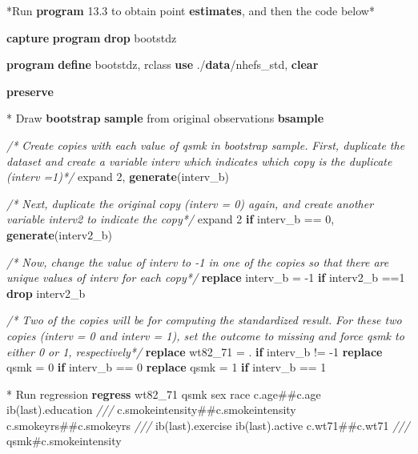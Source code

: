 \documentclass[
  10pt,
]{book}
\newenvironment{Shaded}{\begin{snugshade}}{\end{snugshade}}
\newcommand{\CommentTok}[1]{\textcolor[rgb]{0.56,0.35,0.01}{\textit{#1}}}
\newcommand{\FunctionTok}[1]{\textcolor[rgb]{0.00,0.00,0.00}{#1}}
\newcommand{\KeywordTok}[1]{\textcolor[rgb]{0.13,0.29,0.53}{\textbf{#1}}}
\newcommand{\NormalTok}[1]{#1}
\begin{document}
\begin{Shaded}
\begin{Highlighting}[]
\NormalTok{*Run }\KeywordTok{program}\NormalTok{ 13.3 to obtain point }\KeywordTok{estimates}\NormalTok{, and then the code below*}

\KeywordTok{capture} \KeywordTok{program} \KeywordTok{drop}\NormalTok{ bootstdz}

\KeywordTok{program} \KeywordTok{define}\NormalTok{ bootstdz, rclass}
\KeywordTok{use}\NormalTok{ ./}\KeywordTok{data}\NormalTok{/nhefs\_std, }\KeywordTok{clear}

\KeywordTok{preserve}

\NormalTok{* Draw }\KeywordTok{bootstrap} \KeywordTok{sample}\NormalTok{ from original observations}
\KeywordTok{bsample} 
        
\CommentTok{/* Create copies with each value of qsmk in bootstrap sample.}
\CommentTok{First, duplicate the dataset and create a variable \textasciigrave{}interv\textasciigrave{} which}
\CommentTok{indicates which copy is the duplicate (interv =1)*/}
\NormalTok{expand 2, }\KeywordTok{generate}\NormalTok{(interv\_b)}

\CommentTok{/* Next, duplicate the original copy (interv = 0) again, and create}
\CommentTok{another variable \textasciigrave{}interv2\textasciigrave{} to indicate the copy*/}
\NormalTok{expand 2 }\KeywordTok{if}\NormalTok{ interv\_b == 0, }\KeywordTok{generate}\NormalTok{(interv2\_b)}

\CommentTok{/* Now, change the value of interv to {-}1 in one of the copies so that}
\CommentTok{there are unique values of interv for each copy*/}
\KeywordTok{replace}\NormalTok{ interv\_b = {-}1  }\KeywordTok{if}\NormalTok{ interv2\_b ==1}
\KeywordTok{drop}\NormalTok{ interv2\_b}

\CommentTok{/* Two of the copies will be for computing the standardized result.}
\CommentTok{For these two copies (interv = 0 and interv = 1), set the outcome to}
\CommentTok{missing and force qsmk to either 0 or 1, respectively*/}
\KeywordTok{replace}\NormalTok{ wt82\_71 = . }\KeywordTok{if}\NormalTok{ interv\_b != {-}1}
\KeywordTok{replace}\NormalTok{ qsmk = 0 }\KeywordTok{if}\NormalTok{ interv\_b == 0}
\KeywordTok{replace}\NormalTok{ qsmk = 1 }\KeywordTok{if}\NormalTok{ interv\_b == 1}

\NormalTok{* Run regression}
\KeywordTok{regress}\NormalTok{ wt82\_71 qsmk sex race c.age\#\#c.age ib(}\FunctionTok{last}\NormalTok{).education }\CommentTok{///}
\NormalTok{  c.smokeintensity\#\#c.smokeintensity c.smokeyrs\#\#c.smokeyrs }\CommentTok{///}
\NormalTok{  ib(}\FunctionTok{last}\NormalTok{).exercise ib(}\FunctionTok{last}\NormalTok{).active c.wt71\#\#c.wt71 }\CommentTok{///}
\NormalTok{  qsmk\#c.smokeintensity}


\end{Highlighting}
\end{Shaded}
\end{document}
